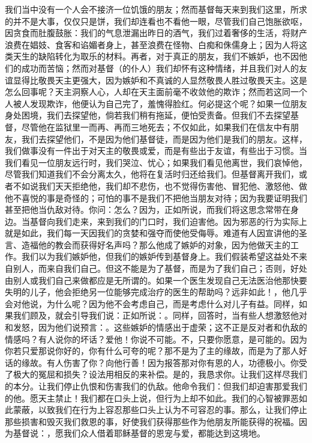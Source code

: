 我们当中没有一个人会不接济一位饥饿的朋友；然而基督每天来到我们这里，所求的并不是大事，仅仅只是饼，我们却连看也不看他一眼，尽管我们自己饱胀欲呕，因贪食而肚腹鼓胀：我们的气息泄漏出昨日的酒气，我们过着奢侈的生活，将财产浪费在娼妓、食客和谄媚者身上，甚至浪费在怪物、白痴和侏儒身上；因为人将这类天生的缺陷转化为取乐的材料。再者，对于真正的朋友，我们不嫉妒，也不因他们的成功而苦恼；然而对基督（的仆人）我们却怀有这种情绪，并且我们对人的友谊显得比敬畏天主更强大，因为嫉妒和不真诚的人显然敬畏人胜过敬畏天主。这是怎么回事呢？天主洞察人心，人却在天主面前毫不收敛他的欺诈；然而若这同一个人被人发现欺诈，他便认为自己完了，羞愧得脸红。何必提这个呢？如果一位朋友身处困境，我们去探望他，倘若我们稍有拖延，便怕受责备。但我们不去探望基督，尽管他在监狱里一而再、再而三地死去；不仅如此，如果我们在信友中有朋友，我们去探望他们，不是因为他们基督徒，而是因为他们是我们的朋友。这样，我们做事没有一件出于对天主的敬畏或爱，而是有些出于友谊，有些出于习惯。当我们看见一位朋友远行时，我们哭泣、忧心；如果我们看见他离世，我们哀悼他，尽管我们知道我们不会分离太久，他将在复活时归还给我们。但基督离开我们，或者不如说我们天天拒绝他，我们却不悲伤，也不觉得伤害他、冒犯他、激怒他、做他不喜悦的事是奇怪的；可怕的事不是我们不把他当朋友对待；因为我要证明我们甚至把他当仇敌对待。你问：怎么？因为，正如所说，而我们将这思念常带在身边。当基督向我们走来，来到我们的门口时，我们迫害他。因为邪恶的行为实际上就是如此，我们每一天因我们的贪婪和强夺而使他受侮辱。难道有人因宣讲他的圣言、造福他的教会而获得好名声吗？那么他成了嫉妒的对象，因为他做天主的工作。我们以为我们嫉妒他，但我们的嫉妒传到基督身上。我们假装希望这益处不来自别人，而来自我们自己。但这不能是为了基督，而是为了我们自己；否则，好处由别人或我们自己来做都应是无所谓的。如果一个医生发现自己无法医治他那快要失明的儿子，他会拒绝另一位能够完成治疗的医生的帮助吗？远非如此！，他几乎会对他说，为什么呢？因为他不会考虑自己，而是考虑什么对儿子有益。同样，如果我们顾及，就会引导我们说：正如所说：。同样，回答时，当有些人想激怒他对和发怒，因为他们说预言：。这些嫉妒的情感出于虚荣；这不正是反对者和仇敌的情感吗？有人说你的坏话？爱他！你说不可能。不，只要你愿意，是可能的。因为你若只爱那说你好的，你有什么可夸的呢？那不是为了主的缘故，而是为了那人好话的缘故。有人伤害了你？向他行善！因为报答那对你有恩的人，功德极小。你受了极大的冤屈和损失？设法用相反的来补偿。是的，我恳求你。让我们这样尽我们的本分。让我们停止仇恨和伤害我们的仇敌。他命令我们：但我们却迫害那爱我们的他。愿天主禁止！我们都在口头上说，但行为上却不如此。我们的心智被罪恶如此蒙蔽，以致我们在行为上容忍那些口头上认为不可容忍的事。那么，让我们停止那些损害和毁灭我们救恩的事，好使我们获得那些作为他朋友所能获得的祝福。因为基督说：，愿我们众人借着耶稣基督的恩宠与爱，都能达到这境地。\par


